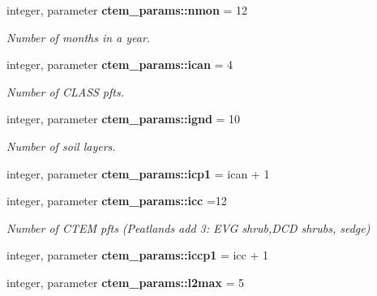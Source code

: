 \begin{DoxyCompactItemize}
\item 
\hypertarget{namespacectem__params_a7d9aa770be284cd553a5356105ce73fb}{}integer, parameter {\bfseries ctem\+\_\+params\+::nmon} = 12\label{namespacectem__params_a7d9aa770be284cd553a5356105ce73fb}

\begin{DoxyCompactList}\small\item\em Number of months in a year. \end{DoxyCompactList}\item 
\hypertarget{namespacectem__params_af834d482b4eec80d530f6f6afc9fc5b5}{}integer, parameter {\bfseries ctem\+\_\+params\+::ican} = 4\label{namespacectem__params_af834d482b4eec80d530f6f6afc9fc5b5}

\begin{DoxyCompactList}\small\item\em Number of C\+L\+A\+S\+S pfts. \end{DoxyCompactList}\item 
\hypertarget{namespacectem__params_aa84174d70bc4dcedb2b6edeb859f1507}{}integer, parameter {\bfseries ctem\+\_\+params\+::ignd} = 10\label{namespacectem__params_aa84174d70bc4dcedb2b6edeb859f1507}

\begin{DoxyCompactList}\small\item\em Number of soil layers. \end{DoxyCompactList}\item 
\hypertarget{namespacectem__params_a8b61932a368c557cc3cb7edf6de23e22}{}integer, parameter {\bfseries ctem\+\_\+params\+::icp1} = ican + 1\label{namespacectem__params_a8b61932a368c557cc3cb7edf6de23e22}

\item 
\hypertarget{namespacectem__params_afa448c586accb0aa6dade1df419eb2fd}{}integer, parameter {\bfseries ctem\+\_\+params\+::icc} =12\label{namespacectem__params_afa448c586accb0aa6dade1df419eb2fd}

\begin{DoxyCompactList}\small\item\em Number of C\+T\+E\+M pfts (Peatlands add 3\+: E\+V\+G shrub,D\+C\+D shrubs, sedge) \end{DoxyCompactList}\item 
\hypertarget{namespacectem__params_a1da4b2c80e21cf1adf10e9c7ee9a2189}{}integer, parameter {\bfseries ctem\+\_\+params\+::iccp1} = icc + 1\label{namespacectem__params_a1da4b2c80e21cf1adf10e9c7ee9a2189}

\item 
\hypertarget{namespacectem__params_af57395876febe85e76b0403ab6a4e8ed}{}integer, parameter {\bfseries ctem\+\_\+params\+::l2max} = 5\label{namespacectem__params_af57395876febe85e76b0403ab6a4e8ed}


\end{DoxyCompactItemize}
